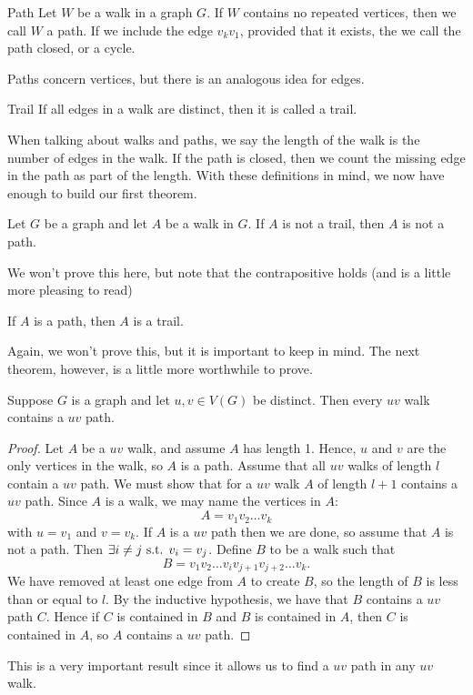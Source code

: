 \begin{definition}{Path}
    Let $W$ be a walk in a graph $G$. If $W$ contains no repeated vertices, then we call $W$ a path. If we include the edge $v_{k}v_{1}$, provided that it exists, the we call the path closed, or a cycle.
\end{definition}

Paths concern vertices, but there is an analogous idea for edges.

\begin{definition}{Trail}
    If all edges in a walk are distinct, then it is called a trail.
\end{definition}

When talking about walks and paths, we say the length of the walk is the number of edges in the walk.
If the path is closed, then we count the missing edge in the path as part of the length.
With these definitions in mind, we now have enough to build our first theorem.

\begin{theorem}{}
    Let $G$ be a graph and let $A$ be a walk in $G$. If $A$ is not a trail, then $A$ is not a path.
\end{theorem}

We won't prove this here, but note that the contrapositive holds (and is a little more pleasing to read)

\begin{theorem}{}
    If $A$ is a path, then $A$ is a trail.
\end{theorem}

Again, we won't prove this, but it is important to keep in mind. The next theorem, however, is a little more worthwhile to prove.

\begin{theorem}{}
    Suppose $G$ is a graph and let $u,v\in V(G)$ be distinct. Then every $uv$ walk contains a $uv$ path.
\end{theorem}
\begin{proof}
    Let $A$ be a $uv$ walk, and assume $A$ has length 1. Hence, $u$ and $v$ are the only vertices in the walk, so $A$ is a path. Assume that all $uv$ walks of length $l$ contain a $uv$ path.
    We must show that for a $uv$ walk $A$ of length $l+1$ contains a $uv$ path.
    Since $A$ is a walk, we may name the vertices in $A$:
    \[
        A = v_{1}v_{2}\dots v_{k}
    \]
    with $u=v_{1}$ and $v=v_{k}$.
    If $A$ is a $uv$ path then we are done, so assume that $A$ is not a path.
    Then $\exists i\neq j \text{ s.t. } v_{i}=v_{j}$.
    Define $B$ to be a walk such that
    \[
        B = v_{1}v_{2}\dots v_{i}v_{j+1}v_{j+2}\dots v_{k}.
    \]
    We have removed at least one edge from $A$ to create $B$, so the length of $B$ is less than or equal to $l$.
    By the inductive hypothesis, we have that $B$ contains a $uv$ path $C$.
    Hence if $C$ is contained in $B$ and $B$ is contained in $A$, then $C$ is contained in $A$, so $A$ contains a $uv$ path.
\end{proof}

This is a very important result since it allows us to find a $uv$ path in any $uv$ walk.
